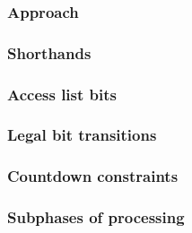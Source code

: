 \subsubsection{Approach                 } \label{rlp txn v2: phase constraints: access list: approach}              
\subsubsection{Shorthands               } \label{rlp txn v2: phase constraints: access list: shorthands}            
\subsubsection{Access list bits         } \label{rlp txn v2: phase constraints: access list: access list bits}      
\subsubsection{Legal bit transitions    } \label{rlp txn v2: phase constraints: access list: legal transitions}     
\subsubsection{Countdown constraints    } \label{rlp txn v2: phase constraints: access list: countdowns}            
\subsubsection{Subphases of processing  } \label{rlp txn v2: phase constraints: access list: access list prefix}    
